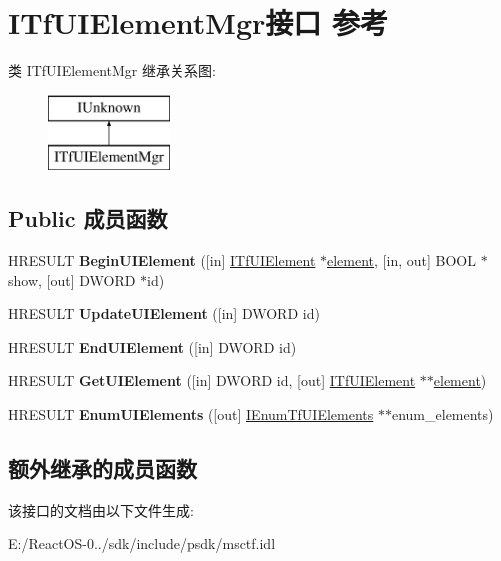 \hypertarget{interface_i_tf_u_i_element_mgr}{}\section{I\+Tf\+U\+I\+Element\+Mgr接口 参考}
\label{interface_i_tf_u_i_element_mgr}
类 I\+Tf\+U\+I\+Element\+Mgr 继承关系图\+:\begin{figure}[H]
\begin{center}
\leavevmode
\includegraphics[height=2.000000cm]{interface_i_tf_u_i_element_mgr}
\end{center}
\end{figure}
\subsection*{Public 成员函数}
\begin{DoxyCompactItemize}
\item 
\mbox{\label{interface_i_tf_u_i_element_mgr_a1881258cfbeeedf10724e30ddb0f7cdd}} 
H\+R\+E\+S\+U\+LT {\bfseries Begin\+U\+I\+Element} (\mbox{[}in\mbox{]} \hyperlink{interface_i_tf_u_i_element}{I\+Tf\+U\+I\+Element} $\ast$\hyperlink{structelement}{element}, \mbox{[}in, out\mbox{]} B\+O\+OL $\ast$show, \mbox{[}out\mbox{]} D\+W\+O\+RD $\ast$id)
\item 
\mbox{\label{interface_i_tf_u_i_element_mgr_a3de3856b2790599a6692839abba1d2bf}} 
H\+R\+E\+S\+U\+LT {\bfseries Update\+U\+I\+Element} (\mbox{[}in\mbox{]} D\+W\+O\+RD id)
\item 
\mbox{\label{interface_i_tf_u_i_element_mgr_a8e0f4c0ea1a5b5d2f8bfed70777adf52}} 
H\+R\+E\+S\+U\+LT {\bfseries End\+U\+I\+Element} (\mbox{[}in\mbox{]} D\+W\+O\+RD id)
\item 
\mbox{\label{interface_i_tf_u_i_element_mgr_abdd73ad31a014e57c688ca1883200c55}} 
H\+R\+E\+S\+U\+LT {\bfseries Get\+U\+I\+Element} (\mbox{[}in\mbox{]} D\+W\+O\+RD id, \mbox{[}out\mbox{]} \hyperlink{interface_i_tf_u_i_element}{I\+Tf\+U\+I\+Element} $\ast$$\ast$\hyperlink{structelement}{element})
\item 
\mbox{\label{interface_i_tf_u_i_element_mgr_a1d62333f3213647028d71afcfc3ddd42}} 
H\+R\+E\+S\+U\+LT {\bfseries Enum\+U\+I\+Elements} (\mbox{[}out\mbox{]} \hyperlink{interface_i_enum_tf_u_i_elements}{I\+Enum\+Tf\+U\+I\+Elements} $\ast$$\ast$enum\+\_\+elements)
\end{DoxyCompactItemize}
\subsection*{额外继承的成员函数}


该接口的文档由以下文件生成\+:\begin{DoxyCompactItemize}
\item 
E\+:/\+React\+O\+S-\/0../sdk/include/psdk/msctf.\+idl\end{DoxyCompactItemize}
